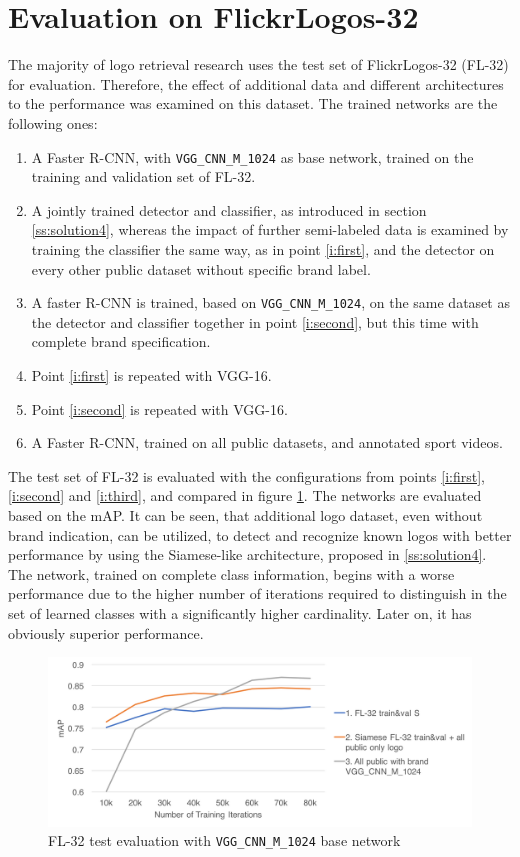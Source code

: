 \section{Evaluation on FlickrLogos-32}\label{s:fleval}
The majority of logo retrieval research uses the test set of FlickrLogos-32 (FL-32) for evaluation. Therefore, the effect of additional data and different architectures to the performance was examined on this dataset. The trained networks are the following ones:
\begin{enumerate}
    \item\label{i:first} A Faster R-CNN, with \texttt{VGG\_CNN\_M\_1024} as base network, trained on the training and validation set of FL-32.
    \item\label{i:second} A jointly trained detector and classifier, as introduced in section \ref{ss:solution4}, whereas the impact of further semi-labeled data is examined by training the classifier the same way, as in point \ref{i:first}, and the detector on every other public dataset without specific brand label.
    \item\label{i:third} A faster R-CNN is trained, based on \texttt{VGG\_CNN\_M\_1024}, on the same dataset as the detector and classifier together in point \ref{i:second}, but this time with complete brand specification.
    \item Point \ref{i:first} is repeated with VGG-16.
    \item Point \ref{i:second} is repeated with VGG-16.
    \item A Faster R-CNN, trained on all public datasets, and annotated sport videos.
\end{enumerate}

The test set of FL-32 is evaluated with the configurations from points \ref{i:first}, \ref{i:second} and \ref{i:third}, and compared in figure \ref{f:vggcnnmfltest}. The networks are evaluated based on the mAP. It can be seen, that additional logo dataset, even without brand indication, can be utilized, to detect and recognize known logos with better performance by using the Siamese-like architecture, proposed in \ref{ss:solution4}. The network, trained on complete class information, begins with a worse performance due to the higher number of iterations required to distinguish in the set of learned classes with a significantly higher cardinality. Later on, it has obviously superior performance.

\begin{figure}
  \centering
  \includegraphics[width=150mm]{images/mt/vggcnnmfltest.png}
  \caption{FL-32 test evaluation with \texttt{VGG\_CNN\_M\_1024} base network}
  \label{f:vggcnnmfltest}
\end{figure}

